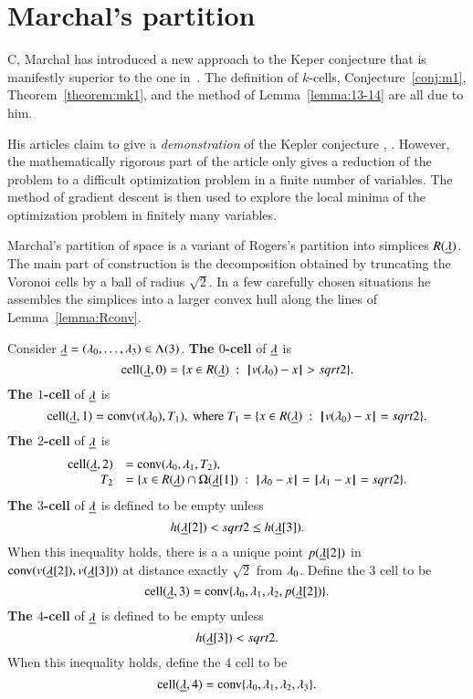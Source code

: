 \section{Marchal's partition}

C, Marchal has introduced a new approach to the Keper conjecture that is manifestly superior to the one in~\cite{Hales:2006:DCG}.  The definition of $k$-cells, Conjecture~\ref{conj:m1}, Theorem~\ref{theorem:mk1}, and the method of Lemma~\ref{lemma:13-14} are all due to him.

His articles claim to give
a {\it demonstration} of the Kepler conjecture \cite{marchal:2007}, \cite{marchal:2008}.  However, the
mathematically rigorous part of the article only gives a reduction
of the problem to a difficult optimization problem in a finite number of
variables.  The method of gradient descent is then used to explore
the local minima of the optimization problem in finitely many variables.

Marchal's partition of space is a variant of Rogers's partition into simplices
$R({\underline{\lambda}})$.  The main part of construction is 
the decomposition obtained by truncating the Voronoi cells
by a ball of radius $\sqrt2$.  In a few carefully chosen situations he assembles the simplices
into a larger convex hull along the lines of Lemma~\ref{lemma:Rconv}.



\begin{definition} Consider ${\underline{\lambda}}=(\lambda_0,\ldots,\lambda_3)\in \Lambda(3)$.
\hfill\break\smallskip  
{\bf The $0$-cell} of ${\underline{\lambda}}$ is
$$
\operatorname{cell}({\underline{\lambda}},0) = \{x\in R({\underline{\lambda}}) \ :\  {\hskip0.1em|\hskip-0.15em|\hskip0.1em}v(\lambda_0) - x{\hskip0.1em|\hskip-0.15em|\hskip0.1em} > sqrt2\}.
$$
\bigskip
{\bf The $1$-cell} of ${\underline{\lambda}}$ is 
$$
\operatorname{cell}({\underline{\lambda}},1) = {\operatorname{conv}}(v(\lambda_0),T_1),\hbox{ where } T_1 = \{x \in R({\underline{\lambda}}) \ :\  {\hskip0.1em|\hskip-0.15em|\hskip0.1em}v(\lambda_0) - x{\hskip0.1em|\hskip-0.15em|\hskip0.1em}= sqrt2\}.
$$
\bigskip
{\bf The $2$-cell} of ${\underline{\lambda}}$ is
$$
\begin{array}{rll}
\operatorname{cell}({\underline{\lambda}},2) &= {\operatorname{conv}}(\lambda_0,\lambda_1,T_2),\quad \\
  T_2 &= \{x \in R({\underline{\lambda}})\cap \Omega({\underline{\lambda}}[1]) \ :\  {\hskip0.1em|\hskip-0.15em|\hskip0.1em}\lambda_0 - x{\hskip0.1em|\hskip-0.15em|\hskip0.1em}={\hskip0.1em|\hskip-0.15em|\hskip0.1em}\lambda_1 - x{\hskip0.1em|\hskip-0.15em|\hskip0.1em} =sqrt2\}.
\end{array}
$$
\bigskip
{\bf The $3$-cell} of ${\underline{\lambda}}$ is defined to be empty unless 
$$
h({\underline{\lambda}}[2]) <sqrt2 \le h({\underline{\lambda}}[3]).
$$
When this inequality holds,
there is a a unique point $p({\underline{\lambda}}[2])$ in
${\operatorname{conv}}(v({\underline{\lambda}}[2]),v({\underline{\lambda}}[3]))$ at distance exactly $\sqrt2$ from $\lambda_0$.  
Define the $3$ cell to be
$$
\operatorname{cell}({\underline{\lambda}},3) = {\operatorname{conv}}\{\lambda_0,\lambda_1,\lambda_2,p({\underline{\lambda}}[2])\}.
$$
\bigskip
{\bf The $4$-cell} of ${\underline{\lambda}}$ is defined to be empty unless
$$
h({\underline{\lambda}}[3]) <sqrt2.
$$
When this inequality holds, define the $4$ cell to be
$$
\operatorname{cell}({\underline{\lambda}},4) = {\operatorname{conv}}\{\lambda_0,\lambda_1,\lambda_2,\lambda_3\}.
$$
\end{definition}

